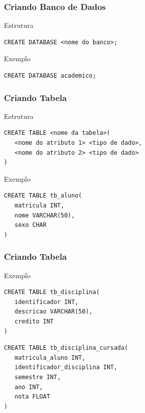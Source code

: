 \documentclass{beamer}
\begin{document}
\begin{frame}[fragile]
\frametitle{Criando Banco de Dados}

\begin{block}{Estrutura}
\begin{lstlisting}
CREATE DATABASE <nome do banco>;
\end{lstlisting}
\end{block}\vfill

\begin{exampleblock}{Exemplo}
\begin{lstlisting}
CREATE DATABASE academico;
\end{lstlisting}
\end{exampleblock}
\end{frame}

\begin{frame}[fragile]
\frametitle{Criando Tabela}

\begin{block}{Estrutura}
\begin{lstlisting}
CREATE TABLE <nome da tabela>(
   <nome do atributo 1> <tipo de dado>,
   <nome do atributo 2> <tipo de dado>
)
\end{lstlisting}
\end{block}\vfill

\begin{exampleblock}{Exemplo}
\begin{lstlisting}
CREATE TABLE tb_aluno(
   matricula INT,
   nome VARCHAR(50),
   sexo CHAR
)
\end{lstlisting}
\end{exampleblock}
\end{frame}

\begin{frame}[fragile]
\frametitle{Criando Tabela}

\begin{exampleblock}{Exemplo}
\begin{lstlisting}
CREATE TABLE tb_disciplina(
   identificador INT,
   descricao VARCHAR(50),
   credito INT
)	
\end{lstlisting}\vfill

\begin{lstlisting}
CREATE TABLE tb_disciplina_cursada(
   matricula_aluno INT,
   identificador_disciplina INT,
   semestre INT,
   ano INT,
   nota FLOAT
)	
\end{lstlisting}
\end{exampleblock}
\end{frame}
\end{document}
